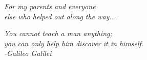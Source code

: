 \newpage
\vspace*{4cm}
\large
\begin{flushright}
\itshape{For my parents and everyone\\else who helped out along the way...}
\end{flushright}

\cleardoublepage

\vspace*{4cm}
\large
\begin{flushright}
\itshape{You cannot teach a man anything;%
	     \\you can only help him discover it in himself.%
	     \\\vspace{0.75em} -Galileo Galilei}
\end{flushright}